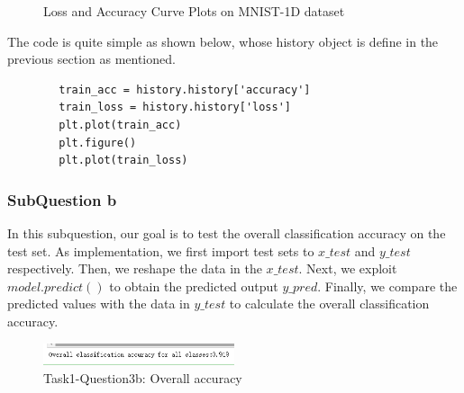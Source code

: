 \documentclass[conference]{IEEEtran}
\begin{document}
	\begin{figure}[h]
		\centering  %
		
		\caption{Loss and Accuracy Curve Plots on MNIST-1D dataset}
		\label{Fig.la}
	\end{figure}
	
	The code is quite simple as shown below, whose history object is define in the previous section as mentioned. 
	
	\begin{lstlisting}
		train_acc = history.history['accuracy']
		train_loss = history.history['loss']
		plt.plot(train_acc)
		plt.figure()
		plt.plot(train_loss)
	\end{lstlisting}
	
	\subsubsection{SubQuestion b}
	In this subquestion, our goal is to test the overall classification accuracy on the test set. As implementation, we first import test sets to $x\_test$ and $y\_test$ respectively. Then, we reshape the data in the $x\_test$. Next, we exploit $model.predict()$ to obtain the predicted output $y\_pred$. Finally, we compare the predicted values with the data in $y\_test$ to calculate the overall classification accuracy.\par
	\begin{figure}[h] 
		\centering
		\includegraphics[width=0.5\textwidth]{T1Q3b.png}
		\caption{Task1-Question3b: Overall accuracy} 
		\label{Fig.t1q3b} 
	\end{figure}
	
\end{document}
